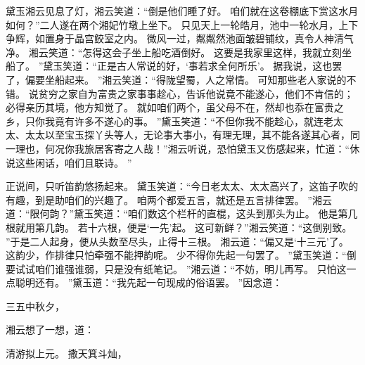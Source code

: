 黛玉湘云见息了灯，湘云笑道：“倒是他们睡了好。
咱们就在这卷棚底下赏这水月如何？”二人遂在两个湘妃竹墩上坐下。
只见天上一轮皓月，池中一轮水月，上下争辉，如置身于晶宫鲛室之内。
微风一过，粼粼然池面皱碧铺纹，真令人神清气净。
湘云笑道：“怎得这会子坐上船吃酒倒好。
这要是我家里这样，我就立刻坐船了。
”黛玉笑道：“正是古人常说的好，‘事若求全何所乐’。
据我说，这也罢了，偏要坐船起来。
”湘云笑道：“得陇望蜀，人之常情。
可知那些老人家说的不错。
说贫穷之家自为富贵之家事事趁心，告诉他说竟不能遂心，他们不肯信的；必得亲历其境，他方知觉了。
就如咱们两个，虽父母不在，然却也忝在富贵之乡，只你我竟有许多不遂心的事。
”黛玉笑道：“不但你我不能趁心，就连老太太、太太以至宝玉探丫头等人，无论事大事小，有理无理，其不能各遂其心者，同一理也，何况你我旅居客寄之人哉！”湘云听说，恐怕黛玉又伤感起来，忙道：“休说这些闲话，咱们且联诗。
”\par
正说间，只听笛韵悠扬起来。
黛玉笑道：“今日老太太、太太高兴了，这笛子吹的有趣，到是助咱们的兴趣了。
咱两个都爱五言，就还是五言排律罢。
”湘云道：“限何韵？”黛玉笑道：“咱们数这个栏杆的直棍，这头到那头为止。
他是第几根就用第几韵。
若十六根，便是‘一先’起。
这可新鲜？”湘云笑道：“这倒别致。
”于是二人起身，便从头数至尽头，止得十三根。
湘云道：“偏又是‘十三元’了。
这韵少，作排律只怕牵强不能押韵呢。
少不得你先起一句罢了。
”黛玉笑道：“倒要试试咱们谁强谁弱，只是没有纸笔记。
”湘云道：“不妨，明儿再写。
只怕这一点聪明还有。
”黛玉道：“我先起一句现成的俗语罢。
”因念道：\par
\hop
三五中秋夕，\par
\hop
湘云想了一想，道：\par
\hop
清游拟上元。
撒天箕斗灿，\par
